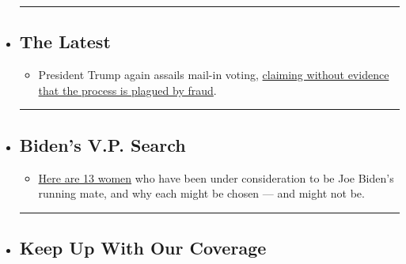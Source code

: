 \begin{itemize}
\item
  \begin{center}\rule{0.5\linewidth}{\linethickness}\end{center}

  \hypertarget{the-latest}{%
  \subsection{The Latest}\label{the-latest}}

  \begin{itemize}
  \tightlist
  \item
    President Trump again assails mail-in voting,
    \href{https://www.nytimes.com/2020/08/03/us/politics/trump-mail-in-voting.html?action=click\&pgtype=Article\&state=default\&region=BELOW_MAIN_CONTENT\&context=storylines_guide}{claiming
    without evidence that the process is plagued by fraud}.
  \end{itemize}
\item
  \begin{center}\rule{0.5\linewidth}{\linethickness}\end{center}

  \hypertarget{bidens-vp-search}{%
  \subsection{Biden's V.P. Search}\label{bidens-vp-search}}

  \begin{itemize}
  \tightlist
  \item
    \href{https://www.nytimes.com/article/biden-vice-president-2020.html?action=click\&pgtype=Article\&state=default\&region=BELOW_MAIN_CONTENT\&context=storylines_guide}{Here
    are 13 women} who have been under consideration to be Joe Biden's
    running mate, and why each might be chosen --- and might not be.
  \end{itemize}
\item
  \begin{center}\rule{0.5\linewidth}{\linethickness}\end{center}

  \hypertarget{keep-up-with-our-coverage}{%
  \subsection{Keep Up With Our
  Coverage}\label{keep-up-with-our-coverage}}


\end{itemize}
